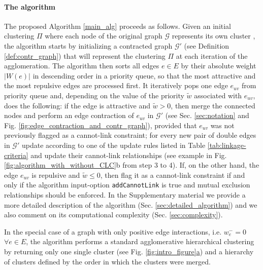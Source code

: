 \paragraph{The algorithm} The proposed Algorithm \ref{main_alg} proceeds as follows. Given an initial clustering $\Pi$ where each node of the original graph $\mathcal{G}$ represents its own cluster  , the algorithm starts by initializing a contracted graph $\mathcal{G}'$ (see Definition \ref{def:contr_graph}) that will represent the clustering $\Pi$ at each iteration of the agglomeration. The algorithm then sorts all edges $e\in E$ by their absolute weight $|W(e)|$ in descending order in a priority queue, so that the most attractive and the most repulsive edges are processed first. It iteratively pops one edge $e_{uv}$ from priority queue and, depending on the value of the priority $\tilde{w}$ associated with $e_{uv}$, does the following: if the edge is attractive and $\tilde{w}>0$, then merge the connected nodes and perform an edge contraction of $e_{uv}$ in $\mathcal{G}'$ (see Sec. \ref{sec:notation} and Fig. \ref{fig:edge_contraction_and_contr_graph}), provided that $e_{uv}$ was not previously flagged as a cannot-link constraint; for every new pair of double edges in $\mathcal{G}'$ update  according to one of the update rules listed in Table \ref{tab:linkage-criteria} and update their cannot-link relationships (see example in Fig. \ref{fig:algorithm_with_without_CLC}b from step 3 to 4). If, on the other hand, the edge $e_{uv}$ is repulsive and $\tilde{w}\leq 0$, then flag it as a cannot-link constraint if and only if the algorithm input-option \texttt{addCannotLink} is true and mutual exclusion relationships should be enforced.
In the Supplementary material we provide a more detailed description of the algorithm (Sec. \ref{sec:detailed_algorithm}) and we also comment on its computational complexity (Sec. \ref{sec:complexity}).

 In the special case of a graph with only positive edge interactions, i.e. $w_e^-=0$ $\forall e\in E$, %
 the algorithm performs a standard agglomerative hierarchical clustering by returning only one single cluster (see Fig. \hyperref[fig:intro_figure]{\ref*{fig:intro_figure}a}) and a hierarchy of clusters defined by the order in which the clusters were merged. 



